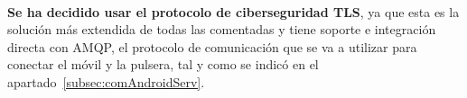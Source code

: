 \paragraph{}
\textbf{Se ha decidido usar el protocolo de ciberseguridad TLS}, ya que esta es la solución más extendida de todas las comentadas y tiene soporte e integración directa con AMQP, el protocolo de comunicación que se va a utilizar para conectar el móvil y la pulsera, tal y como se indicó en el apartado~\ref{subsec:comAndroidServ}.